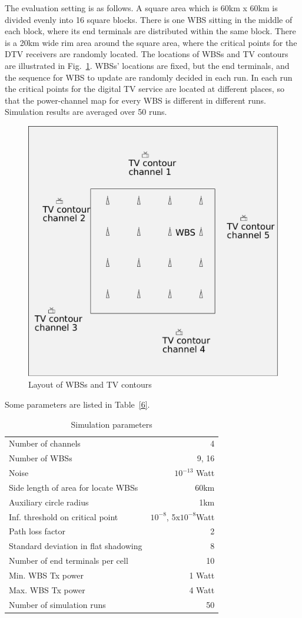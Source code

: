 \documentclass[times]{ettauth}
\theoremstyle{mytheoremstyle}
\theoremstyle{mytheoremstyle}
\theoremstyle{mytheoremstyle}
\begin{document}
The evaluation setting is as follows.
A square area which is 60km x 60km is divided evenly into 16 square blocks.
There is one WBS sitting in the middle of each block,  where its end terminals are distributed within the same block.
There is a 20km wide rim area around the square area, where the critical points for the DTV receivers are randomly located.
The locations of WBSs and TV contours are illustrated in Fig.~\ref{sim:layout}.
WBSs' locations are fixed, but the end terminals, and the sequence for WBS to update are randomly decided in each run.
In each run the critical points for the digital TV service are located at different places, so that the power-channel map for every WBS is different in different runs.
Simulation results are averaged over 50 runs.

\begin{figure}[h!]
  \centering
  \includegraphics[width=0.5\linewidth]{layout.pdf}
  \caption{Layout of WBSs and TV contours}
  \label{sim:layout}
\end{figure}

Some parameters are listed in Table~\ref{6}.

\begin{table}[!h]
\centering
\begin{tabular}{|l|r|}
  \hline
  Number of channels 						& 4 \\
  Number of WBSs							& 9, 16\\
  Noise 									& $10^{-13}$ Watt \\ %
  Side length of area for locate WBSs		& 60km\\
  Auxiliary circle radius 	& 1km \\
  Inf. threshold on critical point 		& $10^{-8}$, 5x$10^{-8}$Watt \\ %
  Path loss factor 							& 2 \\
  Standard deviation in flat shadowing		& 8\\
  Number of end terminals per cell 		& 10 \\
  Min. WBS Tx power 			& 1 Watt \\
  Max. WBS Tx power			& 4 Watt \\
  Number of simulation runs & 50 \\

  \hline
\end{tabular}
\caption{Simulation parameters}
\label{simulationparameter}
\end{table}
\end{document}
